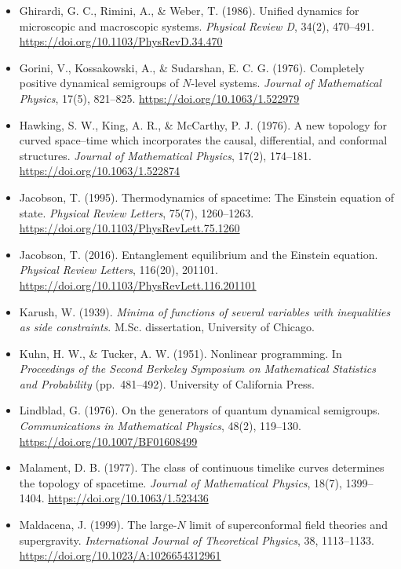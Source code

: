 \documentclass[12pt,a4paper]{article}
\numberwithin{equation}{section}
\begin{document}
\begin{itemize}[leftmargin=0.5in, itemindent=-0.5in, label={}]
\item Ghirardi, G. C., Rimini, A., \& Weber, T. (1986). Unified dynamics for microscopic and macroscopic systems. \textit{Physical Review D}, 34(2), 470--491. \url{https://doi.org/10.1103/PhysRevD.34.470}

\item Gorini, V., Kossakowski, A., \& Sudarshan, E. C. G. (1976). Completely positive dynamical semigroups of $N$-level systems. \textit{Journal of Mathematical Physics}, 17(5), 821--825. \url{https://doi.org/10.1063/1.522979}

\item Hawking, S. W., King, A. R., \& McCarthy, P. J. (1976). A new topology for curved space--time which incorporates the causal, differential, and conformal structures. \textit{Journal of Mathematical Physics}, 17(2), 174--181. \url{https://doi.org/10.1063/1.522874}

\item Jacobson, T. (1995). Thermodynamics of spacetime: The Einstein equation of state. \textit{Physical Review Letters}, 75(7), 1260--1263. \url{https://doi.org/10.1103/PhysRevLett.75.1260}

\item Jacobson, T. (2016). Entanglement equilibrium and the Einstein equation. \textit{Physical Review Letters}, 116(20), 201101. \url{https://doi.org/10.1103/PhysRevLett.116.201101}

\item Karush, W. (1939). \textit{Minima of functions of several variables with inequalities as side constraints}. M.Sc. dissertation, University of Chicago.

\item Kuhn, H. W., \& Tucker, A. W. (1951). Nonlinear programming. In \textit{Proceedings of the Second Berkeley Symposium on Mathematical Statistics and Probability} (pp.\ 481--492). University of California Press.

\item Lindblad, G. (1976). On the generators of quantum dynamical semigroups. \textit{Communications in Mathematical Physics}, 48(2), 119--130. \url{https://doi.org/10.1007/BF01608499}

\item Malament, D. B. (1977). The class of continuous timelike curves determines the topology of spacetime. \textit{Journal of Mathematical Physics}, 18(7), 1399--1404. \url{https://doi.org/10.1063/1.523436}

\item Maldacena, J. (1999). The large-$N$ limit of superconformal field theories and supergravity. \textit{International Journal of Theoretical Physics}, 38, 1113--1133. \url{https://doi.org/10.1023/A:1026654312961}


\end{itemize}
\end{document}
